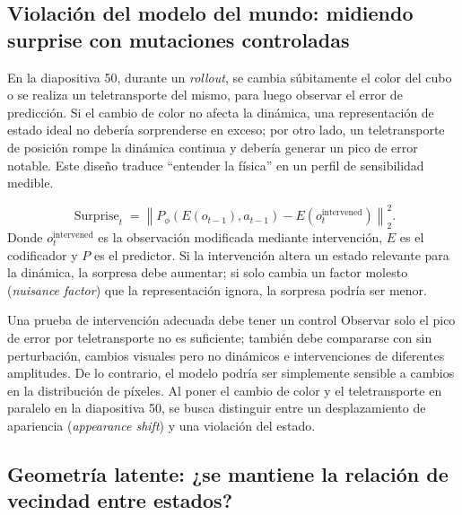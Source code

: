 \subsection{Violación del modelo del mundo: midiendo surprise con mutaciones controladas}

En la diapositiva 50, durante un \textit{rollout}, se cambia súbitamente el color del cubo o se realiza un teletransporte del mismo, para luego observar el error de predicción. Si el cambio de color no afecta la dinámica, una representación de estado ideal no debería sorprenderse en exceso; por otro lado, un teletransporte de posición rompe la dinámica continua y debería generar un pico de error notable. Este diseño traduce ``entender la física'' en un perfil de sensibilidad medible.


\[
\operatorname{Surprise}_t
=\left\|P_\phi(E(o_{t-1}),a_{t-1})-E(o_t^{\text{intervened}})\right\|_2^2.
\]
Donde $o_t^{\text{intervened}}$ es la observación modificada mediante intervención, $E$ es el codificador y $P$ es el predictor. Si la intervención altera un estado relevante para la dinámica, la sorpresa debe aumentar; si solo cambia un factor molesto (\textit{nuisance factor}) que la representación ignora, la sorpresa podría ser menor.


\begin{importantbox}{Una prueba de intervención adecuada debe tener un control}
Observar solo el pico de error por teletransporte no es suficiente; también debe compararse con sin perturbación, cambios visuales pero no dinámicos e intervenciones de diferentes amplitudes. De lo contrario, el modelo podría ser simplemente sensible a cambios en la distribución de píxeles. Al poner el cambio de color y el teletransporte en paralelo en la diapositiva 50, se busca distinguir entre un desplazamiento de apariencia (\textit{appearance shift}) y una violación del estado.
\end{importantbox}

\subsection{Geometría latente: ¿se mantiene la relación de vecindad entre estados?}

